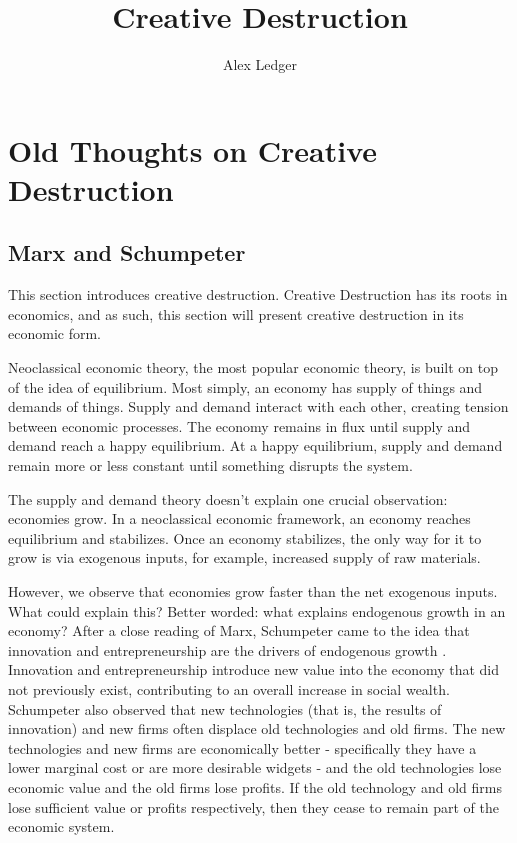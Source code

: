 \documentclass[11pt]{article}
\title{Creative Destruction}
\author{Alex Ledger}
\begin{document}
\maketitle

\section{Old Thoughts on Creative Destruction}
\subsection{Marx and Schumpeter}
This section introduces creative destruction.
Creative Destruction has its roots in economics, and as such, this section will present creative destruction in its economic form.

Neoclassical economic theory, the most popular economic theory, is built on top of the idea of equilibrium.
Most simply, an economy has supply of things and demands of things. 
Supply and demand interact with each other, creating tension between economic processes.
The economy remains in flux until supply and demand reach a happy equilibrium.
At a happy equilibrium, supply and demand remain more or less constant until something disrupts the system.

The supply and demand theory doesn't explain one crucial observation: economies grow.
In a neoclassical economic framework, an economy reaches equilibrium and stabilizes.
Once an economy stabilizes, the only way for it to grow is via exogenous inputs, for example, increased supply of raw materials.

However, we observe that economies grow faster than the net exogenous inputs.
What could explain this?
Better worded: what explains endogenous growth in an economy?
After a close reading of Marx, Schumpeter came to the idea that innovation and entrepreneurship are the drivers of endogenous growth \cite{jaffe}.
Innovation and entrepreneurship introduce new value into the economy that did not previously exist, contributing to an overall increase in social wealth.
Schumpeter also observed that new technologies (that is, the results of innovation)  and new firms often displace old technologies and old firms.
The new technologies and new firms are economically better - specifically they have a lower marginal cost or are more desirable widgets - and the old technologies lose economic value and the old firms lose profits.
If the old technology and old firms lose sufficient value or profits respectively, then they cease to remain part of the economic system.
\end{document}
